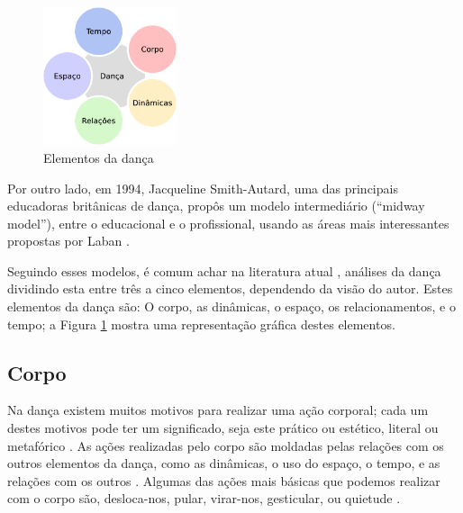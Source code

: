 \begin{figure}
\centering
\vspace{-15pt}
\includegraphics[width=0.35\textwidth]{chapters/cap-dance-elements/DanceElements.eps}
\caption{Elementos da dança}
\label{fig:elementosdanca1}
\vspace{-10pt}
\end{figure}
Por outro lado, em 1994, Jacqueline Smith-Autard, uma das principais educadoras britânicas de dança, 
propôs um modelo intermediário (``midway model''), entre o educacional e o profissional, 
usando as áreas mais interessantes propostas por Laban \cite[pp. 12]{paine2014complete}.

Seguindo esses modelos, é comum achar na literatura atual 
\cite[pp. 4]{carline2011lesson}       %
\cite[pp. 13,27]{paine2014complete}   %
\cite[pp. 69]{schrader2005sense}      %
\cite[pp. 131]{mccutchen2006teaching}, %
análises  da dança dividindo esta entre três a cinco elementos,
dependendo da visão do autor.
Estes elementos da dança são: O corpo, as dinâmicas, o espaço, os relacionamentos, e o tempo;
a Figura \ref{fig:elementosdanca1} mostra uma representação gráfica destes elementos.



\subsection{Corpo}
Na dança existem muitos motivos para realizar uma ação corporal;
cada um destes motivos pode ter um significado, seja este prático ou estético, literal ou metafórico \cite[pp. 5]{carline2011lesson}.
As ações realizadas pelo corpo são moldadas pelas relações com os outros elementos da dança,
como as dinâmicas, o uso do espaço, o tempo, e as relações com os outros \cite[pp. 5]{carline2011lesson}.
Algumas das ações mais básicas que podemos realizar com o corpo são,
desloca-nos, pular, virar-nos, gesticular, ou quietude \cite[pp. 27]{paine2014complete}.

